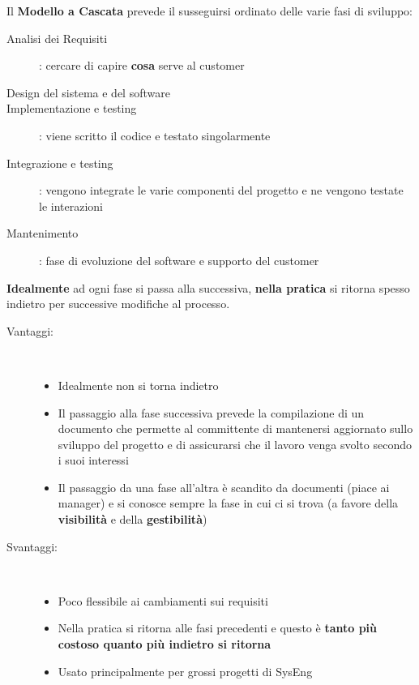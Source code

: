 Il \textbf{Modello a Cascata} prevede il susseguirsi ordinato delle
varie fasi di sviluppo:
\begin{description}
    \item[Analisi dei Requisiti]: cercare di capire \textbf{cosa}
            serve al customer
    \item[Design del sistema e del software]
    \item[Implementazione e testing]: viene scritto il codice e
            testato singolarmente
    \item[Integrazione e testing]: vengono integrate le varie
            componenti del progetto e ne vengono testate le
            interazioni
    \item[Mantenimento]: fase di evoluzione del software e
            supporto del customer    
\end{description}

\textbf{Idealmente} ad ogni fase si passa alla successiva,
\textbf{nella pratica} si ritorna spesso indietro per successive
modifiche al processo.

\begin{description}
    \item[Vantaggi:]\ 
    \begin{itemize}
        \item Idealmente non si torna indietro
        \item Il passaggio alla fase successiva prevede la compilazione
                di un documento che permette al committente di
                mantenersi aggiornato sullo sviluppo del progetto
                e di assicurarsi che il lavoro venga svolto secondo
                i suoi interessi
        \item Il passaggio da una fase all'altra \`e scandito da
                documenti (piace ai manager) e si conosce sempre
                la fase in cui ci si trova (a favore della
                \textbf{visibilit\`a} e della \textbf{gestibilit\`a})
    \end{itemize} 
    \item[Svantaggi:]\ 
    \begin{itemize}
        \item Poco flessibile ai cambiamenti sui requisiti
        \item Nella pratica si ritorna alle fasi precedenti e questo
                \`e \textbf{tanto pi\`u costoso quanto pi\`u indietro
                si ritorna}
        \item Usato principalmente per grossi progetti di SysEng
    \end{itemize} 
\end{description}

